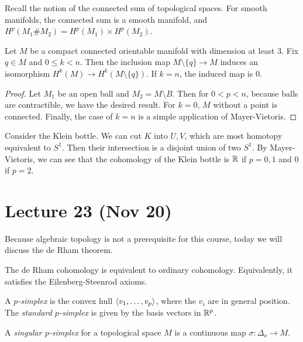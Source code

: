 \documentclass[twoside, 10pt]{article}
\begin{document}
    Recall the notion of the connected sum of topological spaces. For smooth manifolds, the connected sum is a smooth manifold, and $H^p(M_1 \# M_2) = H^p(M_1) \times H^p(M_2)$.

    \begin{prop}
        Let $M$ be a compact connected orientable manifold with dimension at least $3$. Fix $q \in M$ and $0 \leq k < n$. Then the inclusion map $M \setminus \{q\} \to M$ induces an isomorphism $H^k(M) \to H^k(M \setminus \{q\})$. If $k=n$, the induced map is $0$.
    \end{prop}

    \begin{proof}
        Let $M_1$ be an open ball and $M_2 = M \setminus B$. Then for $0 < p < n$, because balls are contractible, we have the desired result. For $k=0$, $M$ without a point is connected. Finally, the case of $k=n$ is a simple application of Mayer-Vietoris.
    \end{proof}

    \begin{exm}
        Consider the Klein bottle. We can cut $K$ into $U,V$, which are most homotopy equivalent to $S^1$. Then their intersection is a disjoint union of two $S^1$. By Mayer-Vietoris, we can see that the cohomology of the Klein bottle is $\mathbb{R}$ if $p = 0,1$ and $0$ if $p=2$.
    \end{exm}

    \section{Lecture 23 (Nov 20)}%
    \label{sec:lecture_23}
    
    Because algebraic topology is not a prerequisite for this course, today we will discuss the de Rham theorem. 

    \begin{thm}
        The de Rham cohomology is equivalent to ordinary cohomology. Equivalently, it satisfies the Eilenberg-Steenrod axioms.
    \end{thm}

    \begin{defn}
        A \textit{$p$-simplex} is the convex hull $\langle v_1, \ldots, v_p\rangle$, where the $v_i$ are in general position. The \textit{standard $p$-simplex} is given by the basis vectors in $\mathbb{R}^p$.
    \end{defn}

    \begin{defn}
        A \textit{singular $p$-simplex} for a topological space $M$ is a continuous map $\sigma: \Delta_o \to M$.
    \end{defn}
\end{document}
